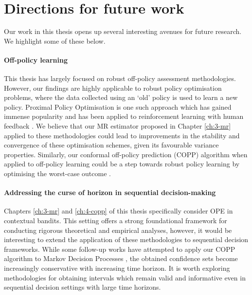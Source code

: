\section{Directions for future work}
Our work in this thesis opens up several interesting avenues for future research. We highlight some of these below.

\paragraph*{Off-policy learning}
This thesis has largely focused on robust off-policy assessment methodologies. However, our findings are highly applicable to robust policy optimisation problems, where the data collected using an `old’ policy is used to learn a new policy. 
Proximal Policy Optimisation \citep{schulman2017proximal} is one such approach which has gained immense popularity and has been applied to reinforcement learning with human feedback \citep{lambert2022illustrating}. 
We believe that our MR estimator proposed in Chapter \ref*{ch:3-mr} applied to these methodologies could lead to improvements in the stability and convergence
of these optimisation schemes, given its favourable variance properties. 
Similarly, our conformal off-policy prediction (COPP) algorithm when applied to off-policy learning could be a
step towards robust policy learning by optimising the worst-case outcome \citep{stutz2021learning}.

\paragraph*{Addressing the curse of horizon in sequential decision-making}
Chapters \ref*{ch:3-mr} and \ref*{ch:4-copp} of this thesis specifically consider OPE in contextual bandits. 
This setting offers a strong foundational framework for conducting rigorous theoretical and empirical analyses, 
however, it would be interesting to extend the application of these methodologies to sequential decision frameworks.
While some follow-up works have attempted to apply our COPP algorithm to Markov Decision Processes \citep{foffano2023conformal, zhang2023conformal, kuipers2024conformal}, the obtained confidence sets become increasingly conservative with increasing time horizon. 
It is worth exploring methodologies for obtaining intervals which remain valid and informative even in sequential decision settings with large time horizons.  


